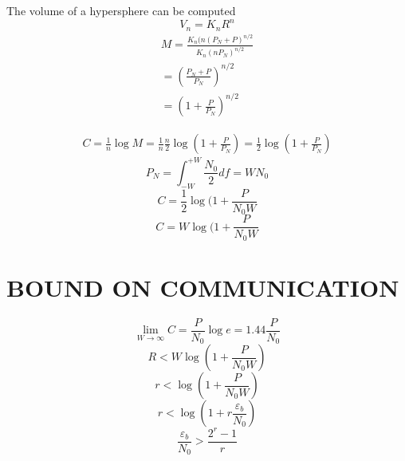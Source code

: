 \documentclass[a4paper, 13pt]{report}
\begin{document}
\par The volume of a hypersphere can be computed 
\begin{equation}
    V_n = K_nR^n
\end{equation}
\begin{equation}
\begin{split}
    M = \frac{K_n(n(P_N+P)^{n/2}}{K_n(nP_N)^{n/2}}\\
    =(\frac{P_N+P}{P_N})^{n/2}\\
    =(1+\frac{P}{P_N})^{n/2}
\end{split}
\end{equation}

\begin{equation}
\begin{split}
    C = \frac{1}{n} \log M
    = \frac{1}{n} \frac{n}{2} \log(1 + \frac{P}{P_N})
    = \frac{1}{2} \log (1+\frac{P}{P_N})
\end{split}    
\end{equation}
\begin{equation}
    P_N = \int_{-W}^{+W}\frac{N_0}{2}df = WN_0
\end{equation}
\begin{equation}
    C = \frac{1}{2}\log (1 + \frac{P}{N_0W}
\end{equation}
\begin{equation}
    C = W\log (1 + \frac{P}{N_0W}
\end{equation}



\chapter{BOUND ON COMMUNICATION}
\begin{equation}
    \lim_{W\rightarrow\infty} C = \frac{P}{N_0}\log e = 1.44\frac{P}{N_0}
\end{equation}
\begin{equation}
    R < W\log (1 + \frac{P}{N_0W})
\end{equation}
\begin{equation}
    r < \log ( 1 + \frac{P}{N_0W})
\end{equation}
\begin{equation}
    r < \log(1 + r\frac{\varepsilon_b}{N_0})
\end{equation}
\begin{equation}
    \frac{\varepsilon_b}{N_0} > \frac{2^r -1}{r}
\end{equation}
\end{document}
